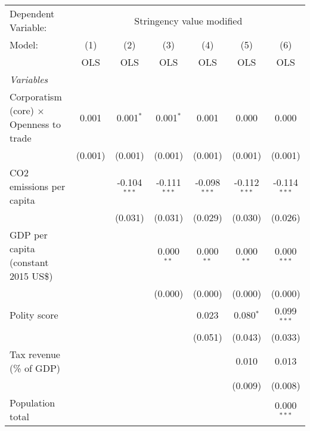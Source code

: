 
\begingroup
\centering
\begin{tabular}{lcccccc}
   \toprule
   Dependent Variable: & \multicolumn{6}{c}{Stringency value modified}\\
   Model:                                         & (1)     & (2)            & (3)            & (4)            & (5)            & (6)\\  
                                                  &  OLS    & OLS            & OLS            & OLS            & OLS            & OLS\\  
   \midrule
   \emph{Variables}\\
   Corporatism (core) $\times$ Openness to trade  & 0.001   & 0.001$^{*}$    & 0.001$^{*}$    & 0.001          & 0.000          & 0.000\\   
                                                  & (0.001) & (0.001)        & (0.001)        & (0.001)        & (0.001)        & (0.001)\\   
   CO2 emissions per capita                       &         & -0.104$^{***}$ & -0.111$^{***}$ & -0.098$^{***}$ & -0.112$^{***}$ & -0.114$^{***}$\\   
                                                  &         & (0.031)        & (0.031)        & (0.029)        & (0.030)        & (0.026)\\   
   GDP per capita (constant 2015 US\$)            &         &                & 0.000$^{**}$   & 0.000$^{**}$   & 0.000$^{**}$   & 0.000$^{***}$\\   
                                                  &         &                & (0.000)        & (0.000)        & (0.000)        & (0.000)\\   
   Polity score                                   &         &                &                & 0.023          & 0.080$^{*}$    & 0.099$^{***}$\\   
                                                  &         &                &                & (0.051)        & (0.043)        & (0.033)\\   
   Tax revenue (\% of GDP)                        &         &                &                &                & 0.010          & 0.013\\   
                                                  &         &                &                &                & (0.009)        & (0.008)\\   
   Population total                               &         &                &                &                &                & 0.000$^{***}$\\   

\end{tabular}
